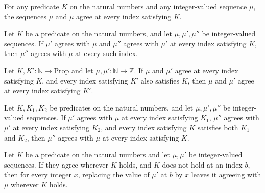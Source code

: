 \begin{theorem}
\label{Light.SameOn.refl}
\leanok
{}
For any predicate $K$ on the natural numbers and any integer-valued sequence $\mu$, the
sequences $\mu$ and $\mu$ agree at every index satisfying $K$.
\end{theorem}

\begin{theorem}
\label{Light.SameOn.trans}
\leanok
{}
Let $K$ be a predicate on the natural numbers, and let $\mu,\mu',\mu''$ be
integer-valued sequences. If $\mu'$ agrees with $\mu$ and $\mu''$ agrees with $\mu'$ at
every index satisfying $K$, then $\mu''$ agrees with $\mu$ at every such index.
\end{theorem}

\begin{theorem}
\label{Light.SameOn.mono}
\leanok
{}
Let $K,K':\mathbb{N}\to\mathrm{Prop}$ and let $\mu,\mu':\mathbb{N}\to\mathbb{Z}$. If
$\mu$ and $\mu'$ agree at every index satisfying $K$, and every index satisfying $K'$
also satisfies $K$, then $\mu$ and $\mu'$ agree at every index satisfying $K'$.
\end{theorem}

\begin{theorem}
\label{Light.SameOn.then}
\leanok
{}
Let $K,K_1,K_2$ be predicates on the natural numbers, and let $\mu,\mu',\mu''$ be
integer-valued sequences. If $\mu'$ agrees with $\mu$ at every index satisfying $K_1$,
$\mu''$ agrees with $\mu'$ at every index satisfying $K_2$, and every index satisfying
$K$ satisfies both $K_1$ and $K_2$, then $\mu''$ agrees with $\mu$ at every index
satisfying $K$.
\end{theorem}

\begin{theorem}
\label{Light.SameOn.write}
\leanok
{}
Let $K$ be a predicate on the natural numbers and let $\mu,\mu'$ be integer-valued
sequences. If they agree wherever $K$ holds, and $K$ does not hold at an index $b$, then
for every integer $x$, replacing the value of $\mu'$ at $b$ by $x$ leaves it agreeing
with $\mu$ wherever $K$ holds.
\end{theorem}

